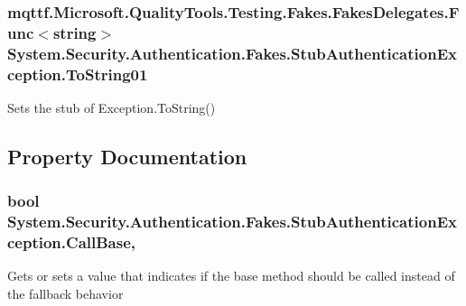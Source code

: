 \hypertarget{class_system_1_1_security_1_1_authentication_1_1_fakes_1_1_stub_authentication_exception_a4a9bc35a4e3237c9bec10f37e9db0ce7}{
\subsubsection[{To\-String01}]{\setlength{\rightskip}{0pt plus 5cm}mqttf.\-Microsoft.\-Quality\-Tools.\-Testing.\-Fakes.\-Fakes\-Delegates.\-Func$<$string$>$ System.\-Security.\-Authentication.\-Fakes.\-Stub\-Authentication\-Exception.\-To\-String01}}\label{class_system_1_1_security_1_1_authentication_1_1_fakes_1_1_stub_authentication_exception_a4a9bc35a4e3237c9bec10f37e9db0ce7}


Sets the stub of Exception.\-To\-String()



\subsection{Property Documentation}
\hypertarget{class_system_1_1_security_1_1_authentication_1_1_fakes_1_1_stub_authentication_exception_a6d274225582914db9da7e3fc8c44294b}{
\subsubsection[{Call\-Base}]{\setlength{\rightskip}{0pt plus 5cm}bool System.\-Security.\-Authentication.\-Fakes.\-Stub\-Authentication\-Exception.\-Call\-Base\hspace{0.3cm}{\ttfamily [get]}, {\ttfamily [set]}}}\label{class_system_1_1_security_1_1_authentication_1_1_fakes_1_1_stub_authentication_exception_a6d274225582914db9da7e3fc8c44294b}


Gets or sets a value that indicates if the base method should be called instead of the fallback behavior

